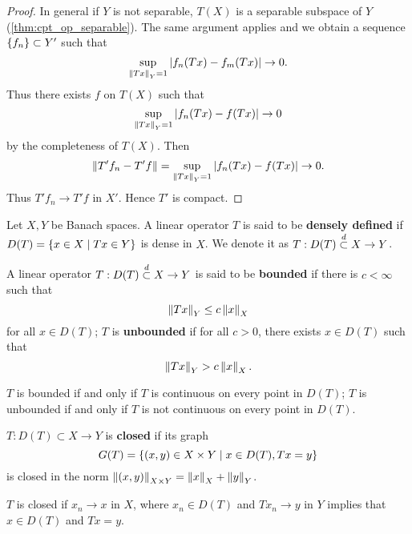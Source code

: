 \begin{proof}
    In general if $Y$ is not separable, $T(X)$ is a separable subspace 
    of $Y$ (\cref{thm:cpt_op_separable}). The same argument applies and 
    we obtain a sequence $\left\{ {f_n} \right\}\subset Y'$ such that 
    \begin{equation*}
        \sup_{\left\lVert {Tx} \right\rVert_Y = 1} \left\lvert {f_n(Tx) - f_m(Tx)} \right\rvert \to 0.
    \end{equation*}
    Thus there exists $f$ on $T(X)$ such that 
    \begin{equation*}
        \sup_{\left\lVert {Tx} \right\rVert_Y = 1} \left\lvert {f_n(Tx) - f(Tx)} \right\rvert \to 0
    \end{equation*}
    by the completeness of $T(X)$. Then 
    \begin{equation*}
        \left\lVert {T'f_n - T'f} \right\rVert = \sup_{\left\lVert {Tx} \right\rVert_Y = 1} \left\lvert {f_n(Tx) - f(Tx)} \right\rvert \to 0.
    \end{equation*}
    Thus $T'f_n\to T'f$ in $X'$. Hence $T'$ is compact.
\end{proof}

\begin{definition}
    Let $X,Y$ be Banach spaces. A linear operator $T$ is said 
    to be \textbf{densely defined} if $D(T) = \left\{ x\in X \;\middle\vert\; Tx\in Y \right\}$ 
    is dense in $X$. We denote it as $T:D(T)\overset{d}{\subset} X\to Y$.
\end{definition} 

\begin{definition}
    A linear operator $T:D(T)\overset{d}{\subset} X\to Y$ is said to be 
    \textbf{bounded} if there is $c < \infty$ such that 
    \begin{equation*}
        \left\lVert {Tx} \right\rVert_Y\leq c\left\lVert {x} \right\rVert_X
    \end{equation*}
    for all $x\in D(T)$; $T$ is \textbf{unbounded} if for all 
    $c>0$, there exists $x\in D(T)$ such that 
    \begin{equation*}
        \left\lVert {Tx} \right\rVert_Y > c\left\lVert {x} \right\rVert_X.
    \end{equation*}
\end{definition}
\begin{remark}
    $T$ is bounded if and only if $T$ is continuous on every 
    point in $D(T)$; $T$ is unbounded if and only if $T$ is not 
    continuous on every point in $D(T)$.
\end{remark}

\begin{definition}
    $T:D(T)\subset X\to Y$ is \textbf{closed} if its graph 
    \begin{equation*}
        G(T) = \left\{ (x,y)\in X\times Y \;\middle\vert\; x\in D(T), Tx = y \right\}
    \end{equation*}
    is closed in the norm $\left\lVert {(x,y)} \right\rVert_{X\times Y} = \left\lVert {x} \right\rVert_X + \left\lVert {y} \right\rVert_Y$.
\end{definition}
\begin{remark}
    $T$ is closed if $x_n\to x$ in $X$, where $x_n\in D(T)$ and 
    $Tx_n\to y$ in $Y$ implies that $x\in D(T)$ and $Tx = y$.
\end{remark}

